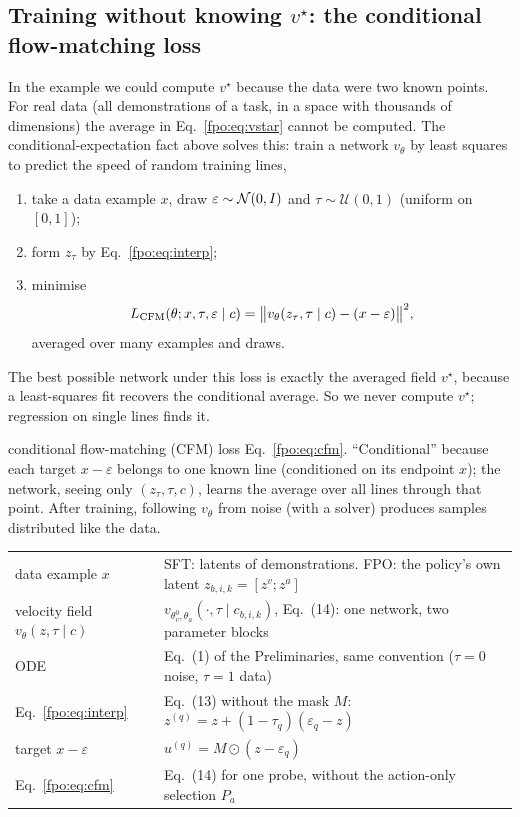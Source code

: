 \subsection{Training without knowing $v^\star$: the conditional flow-matching loss}\label{fpo:sec:cfm}
In the example we could compute $v^\star$ because the data were two known points. For real data (all demonstrations of a task, in a space with thousands of dimensions) the average in Eq.~\eqref{fpo:eq:vstar} cannot be computed. The conditional-expectation fact above solves this: train a network $v_\theta$ by least squares to predict the speed of random training lines,
\begin{enumerate}
\item take a data example $x$, draw $\varepsilon\sim\mathcal{N}(0,I)$ and $\tau\sim\mathcal U(0,1)$ (uniform on $[0,1]$);
\item form $z_\tau$ by Eq.~\eqref{fpo:eq:interp};
\item minimise
\begin{equation}
L_{\mathrm{CFM}}(\theta;x,\tau,\varepsilon\mid c)=\big\|v_\theta(z_\tau,\tau\mid c)-(x-\varepsilon)\big\|^2 ,
\label{fpo:eq:cfm}
\end{equation}
averaged over many examples and draws.
\end{enumerate}
The best possible network under this loss is exactly the averaged field $v^\star$, because a least-squares fit recovers the conditional average. So we never compute $v^\star$; regression on single lines finds it.

\begin{newc}{conditional flow-matching (CFM) loss}
Eq.~\eqref{fpo:eq:cfm}. ``Conditional'' because each target $x-\varepsilon$ belongs to one known line (conditioned on its endpoint $x$); the network, seeing only $(z_\tau,\tau,c)$, learns the average over all lines through that point. After training, following $v_\theta$ from noise (with a solver) produces samples distributed like the data.
\end{newc}

\begin{paperlink}
\begin{tabular}{@{}l p{10.6cm}@{}}
data example $x$ & SFT: latents of demonstrations. FPO: the policy's own latent $z_{b,i,k}=[z^v;z^a]$\\
velocity field $v_\theta(z,\tau\mid c)$ & $v_{\theta_v^0,\theta_a}(\cdot,\tau\mid c_{b,i,k})$, Eq.~(14): one network, two parameter blocks\\
ODE & Eq.~(1) of the Preliminaries, same convention ($\tau=0$ noise, $\tau=1$ data)\\
Eq.~\eqref{fpo:eq:interp} & Eq.~(13) without the mask $M$: $z^{(q)}=z+(1-\tau_q)(\varepsilon_q-z)$\\
target $x-\varepsilon$ & $u^{(q)}=M\odot(z-\varepsilon_q)$\\
Eq.~\eqref{fpo:eq:cfm} & Eq.~(14) for one probe, without the action-only selection $P_a$\\
\end{tabular}
\end{paperlink}

